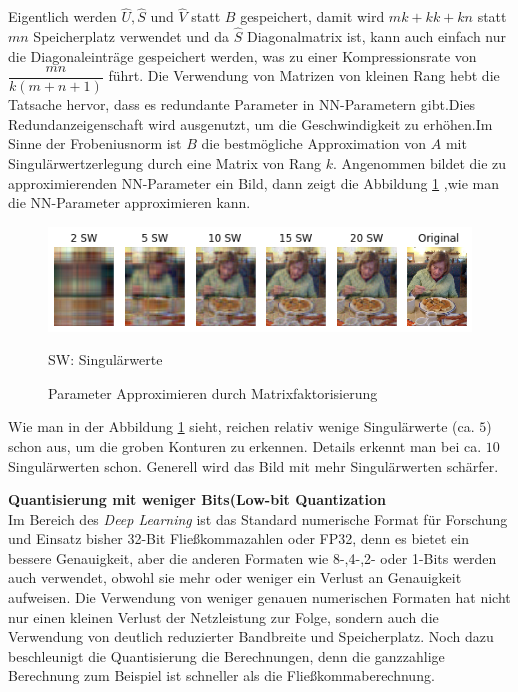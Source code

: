 \documentclass[12pt,a4paper]{scrartcl}
\numberwithin{equation}{section}
\begin{document}
Eigentlich werden $ \widehat{U} , \widehat{S} $ und $ \widehat{V} $ statt $ B $ gespeichert, damit wird $ m k + k k + k n $ statt $ mn $ Speicherplatz verwendet und da $ \widehat{S} $ Diagonalmatrix ist, kann auch einfach nur die Diagonaleinträge gespeichert werden, was zu einer Kompressionsrate von $ \dfrac{mn}{k(m+n+1)} $ führt. Die Verwendung von Matrizen von kleinen Rang hebt die Tatsache hervor, dass es redundante Parameter in \ac{NN}-Parametern gibt.Dies Redundanzeigenschaft wird ausgenutzt, um die Geschwindigkeit zu erhöhen\cite[Denton et al]{matrix quantization}.Im Sinne der Frobeniusnorm ist $ B $ die bestmögliche Approximation von $ A $ mit Singulärwertzerlegung durch eine Matrix von Rang $ k $.
Angenommen bildet die zu approximierenden NN-Parameter ein Bild, dann zeigt die Abbildung \ref{fig:matrix_fatorization} ,wie man die NN-Parameter approximieren kann.

\begin{figure}[h]
	\centering
	\includegraphics[width=\textwidth]{matrix_fatorization}
	\begin{center}
		SW: Singulärwerte
	\end{center}
	\caption{Parameter Approximieren durch Matrixfaktorisierung }
	\label{fig:matrix_fatorization}
\end{figure}
Wie man in der Abbildung \ref{fig:matrix_fatorization} sieht, reichen  relativ wenige Singulärwerte (ca. $ 5 $) schon aus, um die groben Konturen zu erkennen. Details erkennt man bei ca. $ 10 $ Singulärwerten schon. Generell wird das Bild mit mehr Singulärwerten schärfer.

\textbf{Quantisierung mit weniger Bits(Low-bit Quantization}\\
Im Bereich des \textit{Deep Learning} ist das Standard numerische Format für Forschung und Einsatz bisher 32-Bit Fließkommazahlen oder FP32, denn es bietet ein bessere Genauigkeit, aber die anderen Formaten wie 8-,4-,2- oder 1-Bits werden auch verwendet, obwohl sie mehr oder weniger ein Verlust an Genauigkeit aufweisen.
Die Verwendung von weniger genauen numerischen Formaten hat nicht nur einen kleinen Verlust der Netzleistung zur Folge, sondern auch die Verwendung von deutlich reduzierter Bandbreite und Speicherplatz. Noch dazu beschleunigt die Quantisierung die Berechnungen, denn die ganzzahlige Berechnung zum Beispiel ist schneller als die Fließkommaberechnung.
\end{document}

